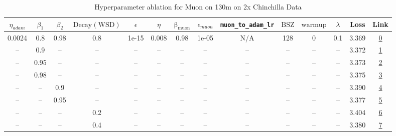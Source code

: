 \begin{table}[H]
\centering
\caption{Hyperparameter ablation for Muon on 130m on 2x Chinchilla Data}
\label{tab:ablation_muon_130m_2}
\begin{tabular}{cccccccccccccc}
\toprule
$\eta_{adam}$ & $\beta_1$ & $\beta_2$ & $\mathrm{Decay (WSD)}$ & $\epsilon$ & $\eta$ & $\mathrm{\beta_{muon}}$ & $\epsilon_{muon}$ & \texttt{muon\_to\_adam\_lr} & $\mathrm{BSZ}$ & $\mathrm{warmup}$ & $\lambda$ & Loss & Link \\
\midrule
0.0024 & 0.8 & 0.98 & 0.8 & 1e-15 & 0.008 & 0.98 & 1e-05 & N/A & 128 & 0 & 0.1 & 3.369 & \href{https://wandb.ai/stanford-mercury/optimizer-scaling/runs/sweep-130m-5B-muon45194alr0.008-wd0.1-minlr0-warmup0-b10.8-b20.9-c1c97c}{0} \\
\midrule
-- & 0.9 & -- & -- & -- & -- & -- & -- & -- & -- & -- & -- & 3.372 & \href{https://wandb.ai/stanford-mercury/optimizer-scaling/runs/sweep-130m-5B-muon055381lr0.008-wd0.1-minlr0-warmup0-b10.9-b20.9-ce41d0}{1} \\
-- & 0.95 & -- & -- & -- & -- & -- & -- & -- & -- & -- & -- & 3.373 & \href{https://wandb.ai/stanford-mercury/optimizer-scaling/runs/sweep-130m-5B-muon1b4dealr0.008-wd0.1-minlr0-warmup0-b10.95-b20.-ce780d}{2} \\
-- & 0.98 & -- & -- & -- & -- & -- & -- & -- & -- & -- & -- & 3.375 & \href{https://wandb.ai/stanford-mercury/optimizer-scaling/runs/sweep-130m-5B-muonc2fb90lr0.008-wd0.1-minlr0-warmup0-b10.98-b20.-b6c7cc}{3} \\
-- & -- & 0.9 & -- & -- & -- & -- & -- & -- & -- & -- & -- & 3.390 & \href{https://wandb.ai/stanford-mercury/optimizer-scaling/runs/sweep-130m-5B-muoncb2d08lr0.008-wd0.1-minlr0-warmup0-b10.8-b20.9-2b200f}{4} \\
-- & -- & 0.95 & -- & -- & -- & -- & -- & -- & -- & -- & -- & 3.377 & \href{https://wandb.ai/stanford-mercury/optimizer-scaling/runs/sweep-130m-5B-muon38610flr0.008-wd0.1-minlr0-warmup0-b10.8-b20.9-8ce9d3}{5} \\
-- & -- & -- & 0.2 & -- & -- & -- & -- & -- & -- & -- & -- & 3.404 & \href{https://wandb.ai/stanford-mercury/optimizer-scaling/runs/sweep-130m-5B-muonf6c5c2lr0.008-wd0.1-minlr0-warmup0-b10.8-b20.9-2406ea}{6} \\
-- & -- & -- & 0.4 & -- & -- & -- & -- & -- & -- & -- & -- & 3.380 & \href{https://wandb.ai/stanford-mercury/optimizer-scaling/runs/sweep-130m-5B-muon294f8alr0.008-wd0.1-minlr0-warmup0-b10.8-b20.9-d0f758}{7} \\

\end{tabular}
\end{table}
